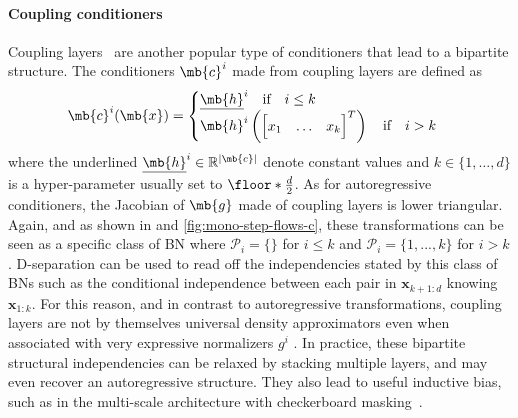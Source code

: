\paragraph{Coupling conditioners}
Coupling layers~\citep{NICE} are another popular type of conditioners that lead to a bipartite structure. The conditioners $\mb{c}^i$ made from coupling layers are defined as
\begin{align*}
    \mb{c}^i(\mb{x}) =
    \begin{cases}
    \underline{\mb{h}}^i \quad \text{if} \quad i \leq k\\
    \mb{h}^i\left(\begin{bmatrix} x_1 & \hdots & x_k \end{bmatrix}^T\right) \quad \text{if} \quad i > k\\
    \end{cases}
\end{align*}
where the underlined $\underline{\mb{h}}^i \in \mathbb{R}^{|\mb{c}|}$ denote constant values and $k \in \{1, \hdots, d\}$ is a hyper-parameter usually set to $\floor*{\frac{d}{2}}$.
As for autoregressive conditioners, the Jacobian of $\mb{g}$ made of coupling layers is lower triangular.
Again, and as shown in  and \ref{fig:mono-step-flows-c}, these transformations can be seen as a specific class of BN where $\mathcal{P}_i=\{\}$ for $i \leq k$ and $\mathcal{P}_i = \{1, ..., k\}$ for $i > k$.
D-separation can be used to read off the independencies stated by this class of BNs such as the conditional independence between each pair in $\mathbf{x}_{k+1:d}$ knowing $\mathbf{x}_{1:k}$.
For this reason, and in contrast to autoregressive transformations, coupling layers are not by themselves universal density approximators even when associated with very expressive normalizers $g^i$ \citep{wehenkel2020you}.
In practice, these bipartite structural independencies can be relaxed by stacking multiple layers, and may even recover an autoregressive structure. They also lead to useful inductive bias, such as in the multi-scale architecture with checkerboard masking~\citep{RealNVP, GLOW}.

